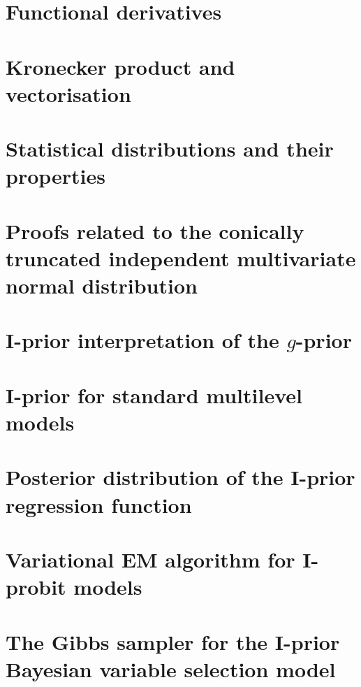 \documentclass[a4paper,showframe,11pt]{report}
\begin{document}

\appendix

\chapter{Functional derivatives}


\chapter{Kronecker product and vectorisation}


\chapter{Statistical distributions and their properties}


\chapter{Proofs related to the conically truncated independent multivariate normal distribution}\label{apx:contrunproof}


\chapter{I-prior interpretation of the $g$-prior}\label{misc:gprior}


\chapter{I-prior for standard multilevel models}\label{misc:multilevelmodels}


\chapter{Posterior distribution of the I-prior regression function}


\chapter{Variational EM algorithm for I-probit models}


\chapter{The Gibbs sampler for the I-prior Bayesian variable selection model}\label{apx:gibbsbvs}

 
%

\hClosingStuffStandalone
\end{document}
